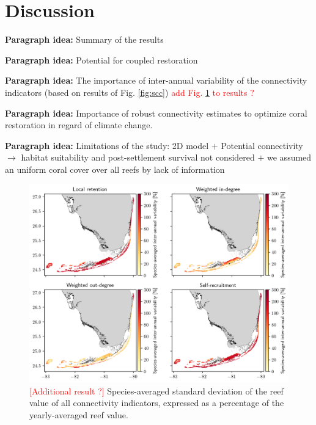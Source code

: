 \documentclass[preprint,12pt,authoryear]{elsarticle}
\begin{document}

\section*{Discussion}

\textbf{Paragraph idea:} Summary of the results

\textbf{Paragraph idea:} Potential for coupled restoration

\textbf{Paragraph idea:} The importance of inter-annual variability of the connectivity indicators (based on results of Fig. \ref{fig:scc}) \textcolor{red}{add Fig. \ref{fig:variabibility} to results ?}

\textbf{Paragraph idea:} Importance of robust connectivity estimates to optimize coral restoration in regard of climate change.

\textbf{Paragraph idea:} Limitations of the study: 2D model $+$ Potential connectivity $\rightarrow$ habitat suitability and post-settlement survival not considered $+$ we assumed an uniform coral cover over all reefs by lack of information

\begin{figure}
    \centering
    \includegraphics[width=\textwidth]{figures/fig_std.png}
    \caption{\textcolor{red}{[Additional result ?]} Species-averaged standard deviation of the reef value of all connectivity indicators, expressed as a percentage of the yearly-averaged reef value.}\label{fig:variabibility}
\end{figure}

\end{document}
